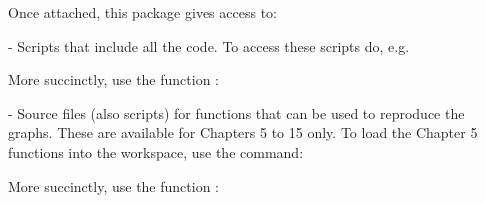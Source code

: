 Once attached, this package gives access to:
\begin{itemizz}
\item[-]
Scripts that include all the code. To access these scripts do, e.g.
\begin{marginfigure}[66pt]
More succinctly, use the function :\\[-3pt]
\begin{knitrout}
\color{fgcolor}\begin{kframe}
\begin{alltt}
\hlstd{(}\hlstd{)}
\end{alltt}
\end{kframe}
\end{knitrout}
\end{marginfigure}
\begin{knitrout}
\color{fgcolor}\begin{kframe}
\begin{alltt}
\hlstd{(}\hlstd{(}\hlstd{,} \hlstd{=}\hlstd{))}
 \hlkwb{<-} \hlstd{(}\hlstd{,}
                       \hlstd{=}\hlstd{)}
\end{alltt}
\end{kframe}
\end{knitrout}
\item[-]
Source files (also scripts) for functions that can be used to
  reproduce the graphs. These are available for Chapters 5 to 15
only.  To load the Chapter 5 functions into the workspace,
use the command:
\begin{marginfigure}[54pt]
More succinctly, use the function :\\[-3pt]
\begin{knitrout}
\color{fgcolor}\begin{kframe}
\begin{alltt}
\hlstd{(}\hlstd{)}
\end{alltt}
\end{kframe}

\end{knitrout}
\end{marginfigure}
\end{itemizz}
